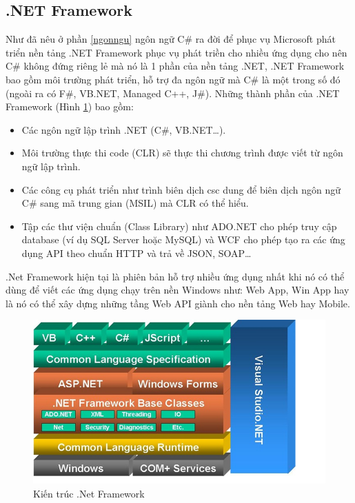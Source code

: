 \subsection{.NET Framework}
Như đã nêu ở phần \ref{ngonngu} ngôn ngữ C\# ra đời để phục vụ Microsoft phát triển nền tảng .NET Framework phục vụ phát triền cho nhiều ứng dụng cho nên C\# không đứng riêng lẻ mà nó là 1 phần của nền tảng .NET, .NET Framework bao gồm môi trường phát triển, hỗ trợ đa ngôn ngữ mà C\# là một trong số đó (ngoài ra có F\#, VB.NET, Managed C++, J\#).
Những thành phần của .NET Framework (Hình \ref{refhinh2_1}) bao gồm:
\begin{itemize}
\item Các ngôn ngữ lập trình .NET (C\#, VB.NET…).
\item Môi trường thực thi code (CLR) sẽ thực thi chương trình được viết từ ngôn ngữ lập trình.
\item Các công cụ phát triển như trình biên dịch csc dung để biên dịch ngôn ngữ C\# sang mã trung gian (MSIL) mà CLR có thể hiểu.
\item Tập các thư viện chuẩn (Class Library) như ADO.NET cho phép truy cập database (ví dụ SQL Server hoặc MySQL) và WCF cho phép tạo ra các ứng dụng API theo chuẩn HTTP và trả về JSON, SOAP…
\end{itemize}
\par
.Net Framework hiện tại là phiên bản hỗ trợ nhiều ứng dụng nhất khi nó có thể dùng để viết các ứng dụng chạy trên nền Windows như: Web App, Win App hay là nó có thể xây dựng những tầng Web API giành cho nền tảng Web hay Mobile.
\begin{center}
    \begin{figure}[h]
    \begin{center}
     \includegraphics[scale=0.6]{image/kienTrucDotNet.png}
    \end{center}
    \caption{Kiến trúc .Net Framework}
    \label{refhinh2_1}
    \end{figure}
\end{center}
